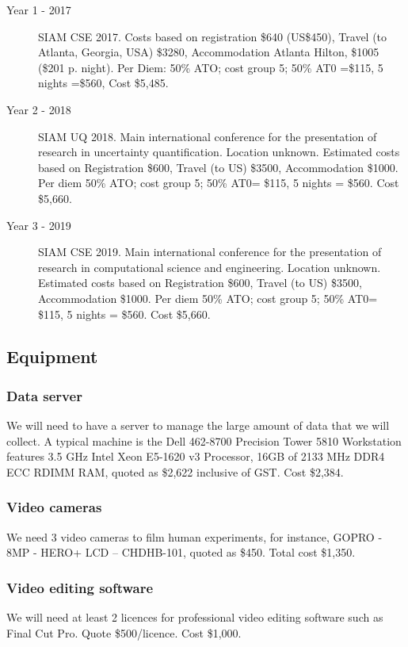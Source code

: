 \documentclass[a4paper,fontsize=12pt]{scrartcl}
\begin{document}
\begin{description}
\item[Year 1 - 2017] SIAM CSE 2017.
Costs based on registration \$640 (US\$450), 
Travel (to Atlanta, Georgia, USA) \$3280, 
Accommodation Atlanta Hilton, \$1005 (\$201 p. night).  
Per Diem: 50\% ATO; cost group 5; 50\% AT0 =\$115, 5 nights =\$560, Cost \$5,485.

\item[Year 2 - 2018] SIAM UQ 2018.
Main international conference for the presentation of research in uncertainty quantification. Location unknown.
Estimated costs based on 
Registration \$600,
Travel (to US) \$3500, 
Accommodation \$1000.
Per diem 50\% ATO; cost group 5; 50\% AT0= \$115, 5 nights = \$560. Cost \$5,660.

\item[Year 3 - 2019]  SIAM CSE 2019.
Main international conference for the presentation of research in computational science and engineering. Location unknown.
Estimated costs based on 
Registration \$600,
Travel (to US) \$3500, 
Accommodation \$1000.
Per diem 50\% ATO; cost group 5; 50\% AT0= \$115, 5 nights = \$560. Cost \$5,660.

\end{description}

\subsection*{Equipment}

\subsubsection*{Data server}

We will need to have a server to manage the large amount of data that we will collect. A typical machine is the Dell 462-8700 Precision Tower 5810 Workstation features 3.5 GHz Intel Xeon E5-1620 v3 Processor, 16GB of 2133 MHz DDR4 ECC RDIMM RAM, quoted as \$2,622 inclusive of GST.  Cost \$2,384.


\subsubsection*{Video cameras}

We need 3 video cameras to film human experiments, for instance, GOPRO - 8MP - HERO+ LCD – CHDHB-101, quoted as \$450. Total cost \$1,350.

\subsubsection*{Video editing software}

We will need at least 2 licences for professional video editing software such as Final Cut Pro. Quote \$500/licence. Cost \$1,000.
\end{document}
